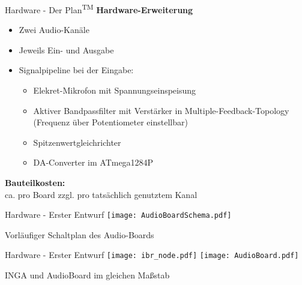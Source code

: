 \documentclass[fleqn,11pt]{beamer}
\begin{document}
\begin{frame}{Hardware - Der Plan\textsuperscript{\small{TM}}}
	\textbf{Hardware-Erweiterung}
	\begin{itemize}
		\item Zwei Audio-Kanäle
		\item Jeweils Ein- und Ausgabe
		\item Signalpipeline  bei der Eingabe:
		\begin{itemize}
			\item Elekret-Mikrofon mit Spannungseinspeisung
			\item Aktiver Bandpassfilter mit Verstärker in Multiple-Feedback-Topology \\(Frequenz über Potentiometer einstellbar) 
			\item Spitzenwertgleichrichter
			\item DA-Converter im ATmega1284P
		\end{itemize}
	\end{itemize}
	\textbf{Bauteilkosten:}\\ ca.  pro Board zzgl.  pro tatsächlich genutztem Kanal
\end{frame}


\begin{frame}{Hardware - Erster Entwurf}
	\texttt{[image: AudioBoardSchema.pdf]}
	
	Vorläufiger Schaltplan des Audio-Boards
\end{frame}

\begin{frame}{Hardware - Erster Entwurf}
	\texttt{[image: ibr\_node.pdf]}
	\texttt{[image: AudioBoard.pdf]}
	
	INGA und AudioBoard im gleichen Maßstab
\end{frame}
\end{document}
